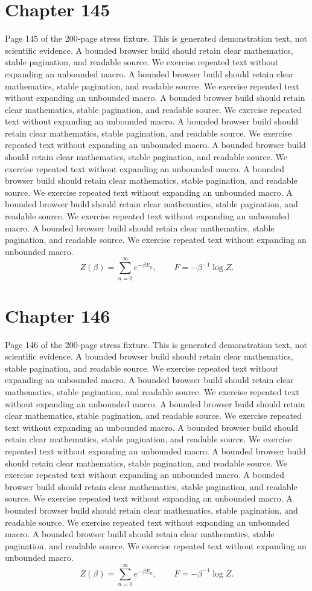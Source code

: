 \documentclass[11pt]{article}
\begin{document}
\section*{Chapter 145}
Page 145 of the 200-page stress fixture. This is generated demonstration text, not scientific evidence.
A bounded browser build should retain clear mathematics, stable pagination, and readable source. We exercise repeated text without expanding an unbounded macro.
A bounded browser build should retain clear mathematics, stable pagination, and readable source. We exercise repeated text without expanding an unbounded macro.
A bounded browser build should retain clear mathematics, stable pagination, and readable source. We exercise repeated text without expanding an unbounded macro.
A bounded browser build should retain clear mathematics, stable pagination, and readable source. We exercise repeated text without expanding an unbounded macro.
A bounded browser build should retain clear mathematics, stable pagination, and readable source. We exercise repeated text without expanding an unbounded macro.
A bounded browser build should retain clear mathematics, stable pagination, and readable source. We exercise repeated text without expanding an unbounded macro.
A bounded browser build should retain clear mathematics, stable pagination, and readable source. We exercise repeated text without expanding an unbounded macro.
A bounded browser build should retain clear mathematics, stable pagination, and readable source. We exercise repeated text without expanding an unbounded macro.
\[Z(\beta)=\sum_{n=0}^{\infty}e^{-\beta E_n},\qquad F=-\beta^{-1}\log Z.\]
\newpage
\section*{Chapter 146}
Page 146 of the 200-page stress fixture. This is generated demonstration text, not scientific evidence.
A bounded browser build should retain clear mathematics, stable pagination, and readable source. We exercise repeated text without expanding an unbounded macro.
A bounded browser build should retain clear mathematics, stable pagination, and readable source. We exercise repeated text without expanding an unbounded macro.
A bounded browser build should retain clear mathematics, stable pagination, and readable source. We exercise repeated text without expanding an unbounded macro.
A bounded browser build should retain clear mathematics, stable pagination, and readable source. We exercise repeated text without expanding an unbounded macro.
A bounded browser build should retain clear mathematics, stable pagination, and readable source. We exercise repeated text without expanding an unbounded macro.
A bounded browser build should retain clear mathematics, stable pagination, and readable source. We exercise repeated text without expanding an unbounded macro.
A bounded browser build should retain clear mathematics, stable pagination, and readable source. We exercise repeated text without expanding an unbounded macro.
A bounded browser build should retain clear mathematics, stable pagination, and readable source. We exercise repeated text without expanding an unbounded macro.
\[Z(\beta)=\sum_{n=0}^{\infty}e^{-\beta E_n},\qquad F=-\beta^{-1}\log Z.\]
\newpage
\end{document}
